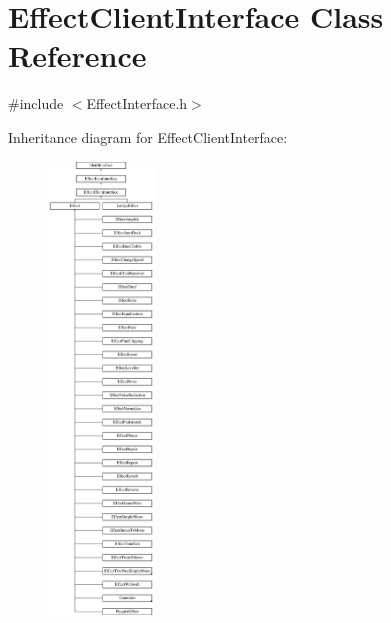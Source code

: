 \hypertarget{class_effect_client_interface}{}\section{Effect\+Client\+Interface Class Reference}
\label{class_effect_client_interface}


{\ttfamily \#include $<$Effect\+Interface.\+h$>$}

Inheritance diagram for Effect\+Client\+Interface\+:\begin{figure}[H]
\begin{center}
\leavevmode
\includegraphics[height=12.000000cm]{class_effect_client_interface}
\end{center}
\end{figure}
